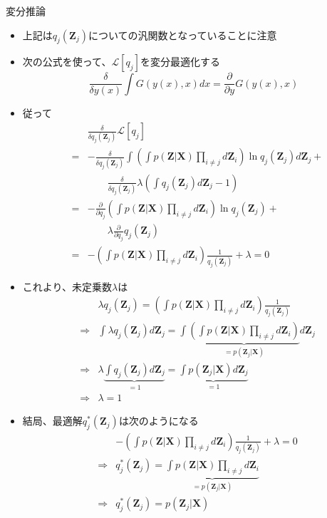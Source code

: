\documentclass[dvipdfmx,notheorems,t]{beamer}
\begin{document}
\begin{frame}{変分推論}
\begin{itemize}
\begin{itemize}
		\item 上記は$q_j(\bm{Z}_j)$についての\alert{汎関数}となっていることに注意
		\newline
		
		\item 次の公式を使って、$\mathcal{L}[q_j]$を変分最適化する
		\begin{equation}
			\frac{\delta}{\delta y(x)} \int G(y(x), x) dx = \frac{\partial}{\partial y} G(y(x), x)
		\end{equation}
		
		\item 従って
		\begin{eqnarray}
			&& \frac{\delta}{\delta q_j(\bm{Z}_j)} \mathcal{L}[q_j] \nonumber \\
			&=& - \frac{\delta}{\delta q_j(\bm{Z}_j)} \int \left( \int p(\bm{Z} | \bm{X}) \prod_{i \neq j} d\bm{Z}_i \right) \ln q_j(\bm{Z}_j) d\bm{Z}_j + \nonumber \\
			&& \qquad \frac{\delta}{\delta q_j(\bm{Z}_j)} \lambda \left( \int q_j(\bm{Z}_j) d\bm{Z}_j - 1 \right) \\
			&=& - \frac{\partial}{\partial q_j} \left( \int p(\bm{Z} | \bm{X}) \prod_{i \neq j} d\bm{Z}_i \right) \ln q_j(\bm{Z}_j) + \nonumber \\
			&& \qquad \lambda \frac{\partial}{\partial q_j} q_j(\bm{Z}_j) \\
			&=& - \left( \int p(\bm{Z} | \bm{X}) \prod_{i \neq j} d\bm{Z}_i \right) \frac{1}{q_j(\bm{Z}_j)} + \lambda = 0
		\end{eqnarray}
		
		\item これより、未定乗数$\lambda$は
		\begin{eqnarray}
			&& \lambda q_j(\bm{Z}_j) = \left( \int p(\bm{Z} | \bm{X}) \prod_{i \neq j} d\bm{Z}_i \right) \frac{1}{q_j(\bm{Z}_j)} \\
			&\Rightarrow& \int \lambda q_j(\bm{Z}_j) d\bm{Z}_j = \int \underbrace{\left( \int p(\bm{Z} | \bm{X}) \prod_{i \neq j} d\bm{Z}_i \right)}_{=p(\bm{Z}_j | \bm{X})} d\bm{Z}_j \\
			&\Rightarrow& \lambda \underbrace{\int q_j(\bm{Z}_j) d\bm{Z}_j}_{=1} = \underbrace{\int p(\bm{Z}_j | \bm{X}) d\bm{Z}_j}_{=1} \\
			&\Rightarrow& \lambda = 1
		\end{eqnarray}
		
		\item 結局、最適解$q_j^*(\bm{Z}_j)$は次のようになる
		\begin{eqnarray}
			&& - \left( \int p(\bm{Z} | \bm{X}) \prod_{i \neq j} d\bm{Z}_i \right) \frac{1}{q_j(\bm{Z}_j)} + \lambda = 0 \\
			&\Rightarrow& q_j^*(\bm{Z}_j) = \underbrace{\int p(\bm{Z} | \bm{X}) \prod_{i \neq j} d\bm{Z}_i}_{=p(\bm{Z}_j | \bm{X})} \\
			&\Rightarrow& q_j^*(\bm{Z}_j) = p(\bm{Z}_j | \bm{X})
		\end{eqnarray}
		

\end{itemize}
\end{itemize}
\end{frame}
\end{document}
